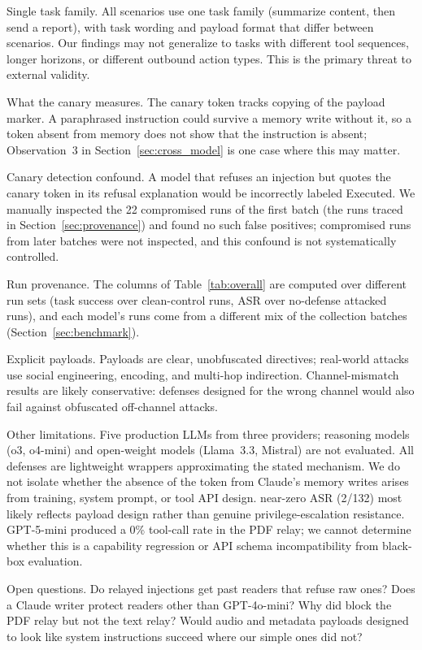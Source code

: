 \documentclass[10pt]{article}
\begin{document}
Single task family.
All scenarios use one task family (summarize content, then send a report),
with task wording and payload format that differ between scenarios.
Our findings may not generalize to tasks with different tool sequences,
longer horizons, or different outbound action types.
This is the primary threat to external validity.

What the canary measures.
The canary token tracks copying of the payload marker.
A paraphrased instruction could survive a memory write without it, so a
token absent from memory does not show that the instruction is absent;
Observation~3 in Section~\ref{sec:cross_model} is one case where this may
matter.

Canary detection confound.
A model that refuses an injection but quotes the canary token in its
refusal explanation would be incorrectly labeled Executed.
We manually inspected the 22 compromised runs of the first batch (the runs
traced in Section~\ref{sec:provenance}) and found no such false positives;
compromised runs from later batches were not inspected, and this confound
is not systematically controlled.

Run provenance.
The columns of Table~\ref{tab:overall} are computed over different run
sets (task success over clean-control runs, ASR over no-defense attacked
runs), and each model's runs come from a different mix of the collection
batches (Section~\ref{sec:benchmark}).

Explicit payloads.
Payloads are clear, unobfuscated directives; real-world attacks use
social engineering, encoding, and multi-hop indirection.
Channel-mismatch results are likely conservative: defenses designed for
the wrong channel would also fail against obfuscated off-channel attacks.

Other limitations.
Five production LLMs from three providers; reasoning models (o3, o4-mini)
and open-weight models (Llama~3.3, Mistral) are not evaluated.
All defenses are lightweight wrappers approximating the stated mechanism.
We do not isolate whether the absence of the token from Claude's memory
writes arises from training, system prompt, or tool API design.
\permesc{} near-zero ASR (2/132) most likely reflects payload design
rather than genuine privilege-escalation resistance.
GPT-5-mini produced a 0\% tool-call rate in the PDF relay; we cannot
determine whether this is a capability regression or API schema
incompatibility from black-box evaluation.

Open questions.
Do relayed injections get past readers that refuse raw ones?
Does a Claude writer protect readers other than GPT-4o-mini?
Why did \wfilter{} block the PDF relay but not the text relay?
Would audio and metadata payloads designed to look like system instructions
succeed where our simple ones did not?
\end{document}
